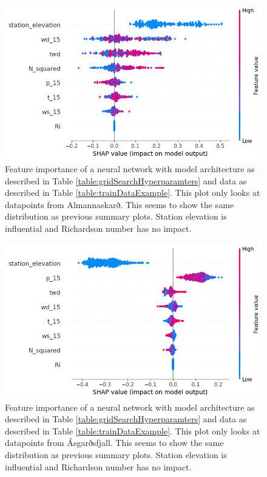 \begin{figure}
    \centering
    \includegraphics[scale = 0.6]{Figures/shap_plots/summary_plot_35553.png}
    \caption[Summary feature importance of a neural network only looking at AWS at Almannaskarð.]{Feature importance of a neural network with model architecture as described in Table \ref{table:gridSearchHyperparamters} and data as described in Table \ref{table:trainDataExample}. This plot only looks at datapoints from Almannaskarð. This seems to show the same distribution as previous summary plots. Station elevation is influential and Richardson number has no impact.}
    \label{fig:ShapleySummaryAlmannaskarð}
\end{figure}

\begin{figure}
    \centering
    \includegraphics[scale = 0.6]{Figures/shap_plots/summary_plot_6745.png}
    \caption[Summary feature importance of a neural network only looking at AWS at Ásgarðsfjall.]{Feature importance of a neural network with model architecture as described in Table \ref{table:gridSearchHyperparamters} and data as described in Table \ref{table:trainDataExample}. This plot only looks at datapoints from Ásgarðsfjall. This seems to show the same distribution as previous summary plots. Station elevation is influential and Richardson number has no impact.}
    \label{fig:ShapleySummaryAsgarðsfjall}
\end{figure}

